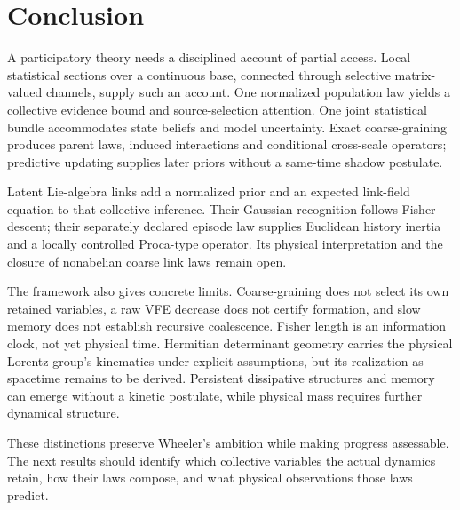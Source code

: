\section{Conclusion}\label{sec:global_conclusion}

A participatory theory needs a disciplined account of partial access. Local statistical sections over a continuous base, connected through selective matrix-valued channels, supply such an account. One normalized population law yields a collective evidence bound and source-selection attention. One joint statistical bundle accommodates state beliefs and model uncertainty. Exact coarse-graining produces parent laws, induced interactions and conditional cross-scale operators; predictive updating supplies later priors without a same-time shadow postulate.

Latent Lie-algebra links add a normalized prior and an expected link-field equation to that collective inference. Their Gaussian recognition follows Fisher descent; their separately declared episode law supplies Euclidean history inertia and a locally controlled Proca-type operator. Its physical interpretation and the closure of nonabelian coarse link laws remain open.

The framework also gives concrete limits. Coarse-graining does not select its own retained variables, a raw VFE decrease does not certify formation, and slow memory does not establish recursive coalescence. Fisher length is an information clock, not yet physical time. Hermitian determinant geometry carries the physical Lorentz group's kinematics under explicit assumptions, but its realization as spacetime remains to be derived. Persistent dissipative structures and memory can emerge without a kinetic postulate, while physical mass requires further dynamical structure.

These distinctions preserve Wheeler's ambition while making progress assessable. The next results should identify which collective variables the actual dynamics retain, how their laws compose, and what physical observations those laws predict.

